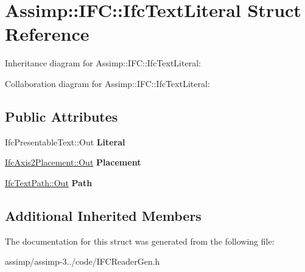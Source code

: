 \hypertarget{struct_assimp_1_1_i_f_c_1_1_ifc_text_literal}{\section{Assimp\+:\+:I\+F\+C\+:\+:Ifc\+Text\+Literal Struct Reference}
\label{struct_assimp_1_1_i_f_c_1_1_ifc_text_literal}
}


Inheritance diagram for Assimp\+:\+:I\+F\+C\+:\+:Ifc\+Text\+Literal\+:


Collaboration diagram for Assimp\+:\+:I\+F\+C\+:\+:Ifc\+Text\+Literal\+:
\subsection*{Public Attributes}
\begin{DoxyCompactItemize}
\item 
\hypertarget{struct_assimp_1_1_i_f_c_1_1_ifc_text_literal_ace95bbec977cc00b2683b62bc768ea19}{Ifc\+Presentable\+Text\+::\+Out {\bfseries Literal}}\label{struct_assimp_1_1_i_f_c_1_1_ifc_text_literal_ace95bbec977cc00b2683b62bc768ea19}

\item 
\hypertarget{struct_assimp_1_1_i_f_c_1_1_ifc_text_literal_a55c85dc74977ff154057bf6e20fd8694}{\hyperlink{classboost_1_1shared__ptr}{Ifc\+Axis2\+Placement\+::\+Out} {\bfseries Placement}}\label{struct_assimp_1_1_i_f_c_1_1_ifc_text_literal_a55c85dc74977ff154057bf6e20fd8694}

\item 
\hypertarget{struct_assimp_1_1_i_f_c_1_1_ifc_text_literal_aa879c89e0b98d938b08a13e0cbf8f7d9}{\hyperlink{classboost_1_1shared__ptr}{Ifc\+Text\+Path\+::\+Out} {\bfseries Path}}\label{struct_assimp_1_1_i_f_c_1_1_ifc_text_literal_aa879c89e0b98d938b08a13e0cbf8f7d9}

\end{DoxyCompactItemize}
\subsection*{Additional Inherited Members}


The documentation for this struct was generated from the following file\+:\begin{DoxyCompactItemize}
\item 
assimp/assimp-\/3../code/I\+F\+C\+Reader\+Gen.\+h\end{DoxyCompactItemize}
